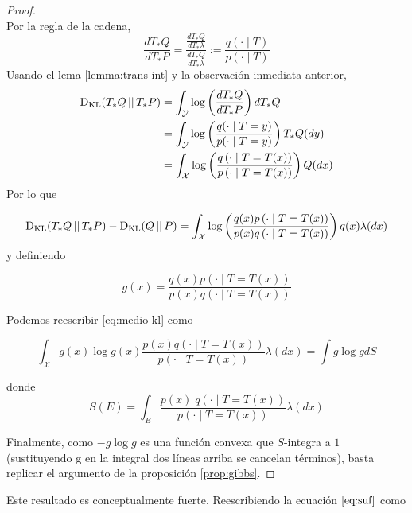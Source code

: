 \documentclass[main.tex]{subfiles}
\begin{document}
\begin{proof} $\ $ \\
Por la regla de la cadena, 
\begin{equation*}
	\frac{dT_*Q}{dT_*P}=\frac{\frac{dT_*Q}{dT_*\lambda}}{\frac{dT_*Q}{dT_*\lambda}}
	:= \frac{q(\cdot\mid T)}{p(\cdot\mid T)}
\end{equation*}
Usando el lema \ref{lemma:trans-int} y la observación inmediata anterior,
\begin{align*}
\operatorname*{D_{KL}}(T_*Q\operatorname*{\mid\mid} T_*P) &= \int_\mathcal{Y}\log\left(\frac{dT_*Q}{dT_*P}\right)dT_*Q \\
&= \int_\mathcal{Y} \log\left(\frac{q(\cdot\mid T=y)}{p(\cdot\mid T=y)}\right)T_*Q(dy) \\
&= \int_\mathcal{X}\log\left(\frac{q\left(\cdot\mid T=T(x)\right)}{p\left(\cdot\mid T=T(x)\right)}\right)Q(dx) \\
\end{align*}
Por lo que 

\begin{equation}\label{eq:medio-kl}
\operatorname*{D_{KL}}(T_*Q\operatorname*{\mid\mid} T_*P)-\operatorname*{D_{KL}}(Q\operatorname*{\mid\mid} P)
	=\int_\mathcal{X} \log\left(
	\frac{q(x)p\left(\cdot\mid T= T(x)\right)}{p(x)q\left(\cdot\mid T=T(x)\right)}
	\right)
	q(x)\lambda(dx) \\
\end{equation}
y definiendo

\begin{equation*}
g(x)=\frac{q(x)p\left(\cdot\mid T=T(x)\right)}{p(x)q\left(\cdot\mid T=T(x)\right)}
\end{equation*}

Podemos reescribir \eqref{eq:medio-kl} como

\begin{equation*}
\int_\mathcal{X}g(x)\log g(x)\frac{p(x)q( \cdot \mid T=T(x))}{p( \cdot\mid T=T(x))}\lambda(dx)
= \int g \log g dS
\end{equation*}

donde 
\begin{equation*}
S(E) = \int_E \frac{p(x)\; q(\cdot \mid T=T(x))}{p\left(\cdot \mid T=T(x)\right)}\lambda(dx)
\end{equation*}

Finalmente, como $-g\log g$ es una función convexa que $S$-integra a $1$ (sustituyendo g en la integral dos líneas arriba se cancelan términos), basta replicar el argumento de la proposición \ref{prop:gibbs}.
\end{proof}

Este resultado es conceptualmente fuerte. Reescribiendo la ecuación $\eqref{eq:suf}$ como 
\end{document}
